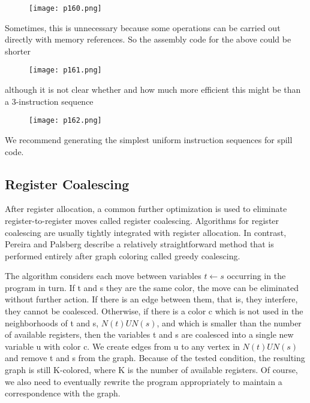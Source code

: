 \begin{figure}[H]
	\centering
	\texttt{[image: p160.png]}
	\caption{}
	\label{fig:p160}
\end{figure}


Sometimes, this is unnecessary because some operations can be carried
out directly with memory references. So the assembly code for the above
could be shorter

\begin{figure}[H]
	\centering
	\texttt{[image: p161.png]}
	\caption{}
	\label{fig:p161}
\end{figure}

although it is not clear whether and how much more efficient this might be
than a 3-instruction sequence

\begin{figure}[H]
	\centering
	\texttt{[image: p162.png]}
	\caption{}
	\label{fig:p162}
\end{figure}

We recommend generating the simplest uniform instruction sequences for
spill code.

\subsection{Register Coalescing}


After register allocation, a common further optimization is used to eliminate register-to-register moves called register coalescing. Algorithms for
register coalescing are usually tightly integrated with register allocation. In
contrast, Pereira and Palsberg describe a relatively straightforward method
that is performed entirely after graph coloring called greedy coalescing.


The algorithm considers each move between variables $t \leftarrow s$ occurring
in the program in turn. If t and s they are the same color, the move can be
eliminated without further action. If there is an edge between them, that
is, they interfere, they cannot be coalesced. Otherwise, if there is a color c
which is not used in the neighborhoods of t and s, $N(t) U N(s)$, and which is
smaller than the number of available registers, then the variables t and s are
coalesced into a single new variable u with color c. We create edges from u
to any vertex in $N(t) U N(s)$ and remove t and s from the graph. Because
of the tested condition, the resulting graph is still K-colored, where K is
the number of available registers. Of course, we also need to eventually
rewrite the program appropriately to maintain a correspondence with the graph.

